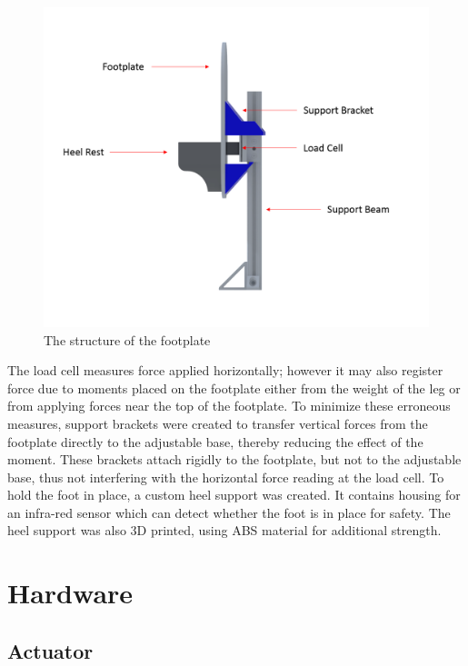 \documentclass[12pt]{report}
\begin{document}
	
	\begin{figure}[h] 
		\centering
		\includegraphics[width=\linewidth]{footplate_label}
		\caption{The structure of the footplate}
		\label{fig:footplate_label}
	\end{figure}
	

	The load cell measures force applied horizontally; however it may also register force due to moments placed on the footplate either from the weight of the leg or from applying forces near the top of the footplate. To minimize these erroneous measures, support brackets were created to transfer vertical forces from the footplate directly to the adjustable base, thereby reducing the effect of the moment. These brackets attach rigidly to the footplate, but not to the adjustable base, thus not interfering with the horizontal force reading at the load cell. To hold the foot in place, a custom heel support was created. It contains housing for an infra-red sensor which can detect whether the foot is in place for safety. The heel support was also 3D printed, using ABS material for additional strength. 
	
	\section{Hardware}
		\subsection{Actuator}	
		
\end{document}
